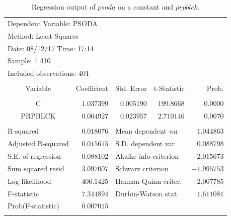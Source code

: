 \documentclass[12pt]{report}
\begin{document}
\begin{table}[H]
	\centering
	\begin{tabular}{lrrrr}
		\multicolumn{3}{l}{Dependent Variable: PSODA}&\multicolumn{1}{c}{}&\multicolumn{1}{c}{}\\
		\multicolumn{3}{l}{Method: Least Squares}&\multicolumn{1}{c}{}&\multicolumn{1}{c}{}\\
		\multicolumn{3}{l}{Date: 08/12/17   Time: 17:14}&\multicolumn{1}{c}{}&\multicolumn{1}{c}{}\\
		\multicolumn{2}{l}{Sample: 1 410}&\multicolumn{1}{c}{}&\multicolumn{1}{c}{}&\multicolumn{1}{c}{}\\
		\multicolumn{3}{l}{Included observations: 401}&\multicolumn{1}{c}{}&\multicolumn{1}{c}{}\\
		[4.5pt] \hline \\ [-4.5pt]
		\multicolumn{1}{c}{Variable}&\multicolumn{1}{r}{Coefficient}&\multicolumn{1}{r}{Std. Error}&\multicolumn{1}{r}{t-Statistic}&\multicolumn{1}{r}{Prob.}\\
		[4.5pt] \hline \\ [-4.5pt]
		\multicolumn{1}{c}{C}&\multicolumn{1}{r}{$1.037399$}&\multicolumn{1}{r}{$0.005190$}&\multicolumn{1}{r}{$199.8668$}&\multicolumn{1}{r}{$0.0000$}\\
		\multicolumn{1}{c}{PRPBLCK}&\multicolumn{1}{r}{$0.064927$}&\multicolumn{1}{r}{$0.023957$}&\multicolumn{1}{r}{$2.710146$}&\multicolumn{1}{r}{$0.0070$}\\
		[4.5pt] \hline \\ [-4.5pt]
		\multicolumn{1}{l}{R-squared}&\multicolumn{1}{r}{$0.018076$}&\multicolumn{2}{l}{Mean dependent var}&\multicolumn{1}{r}{$1.044863$}\\
		\multicolumn{1}{l}{Adjusted R-squared}&\multicolumn{1}{r}{$0.015615$}&\multicolumn{2}{l}{S.D. dependent var}&\multicolumn{1}{r}{$0.088798$}\\
		\multicolumn{1}{l}{S.E. of regression}&\multicolumn{1}{r}{$0.088102$}&\multicolumn{2}{l}{Akaike info criterion}&\multicolumn{1}{r}{$-2.015673$}\\
		\multicolumn{1}{l}{Sum squared resid}&\multicolumn{1}{r}{$3.097007$}&\multicolumn{2}{l}{Schwarz criterion}&\multicolumn{1}{r}{$-1.995753$}\\
		\multicolumn{1}{l}{Log likelihood}&\multicolumn{1}{r}{$406.1425$}&\multicolumn{2}{l}{Hannan-Quinn criter.}&\multicolumn{1}{r}{$-2.007785$}\\
		\multicolumn{1}{l}{F-statistic}&\multicolumn{1}{r}{$7.344894$}&\multicolumn{2}{l}{Durbin-Watson stat}&\multicolumn{1}{r}{$1.611081$}\\
		\multicolumn{1}{l}{Prob(F-statistic)}&\multicolumn{1}{r}{$0.007015$}&\multicolumn{1}{c}{}&\multicolumn{1}{c}{}&\multicolumn{1}{c}{}\\
		[4.5pt] \hline \\ [-4.5pt]
	\end{tabular}
	\caption{Regression output of $psoda$ on a constant and $prpblck$.}
\end{table}
\end{document}
